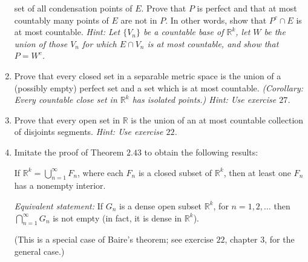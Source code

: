 \begin{enumerate}
  set of all condensation points of \(E\).
  Prove that \(P\) is perfect and that at most countably many points of \(E\)
  are not in \(P\).
  In other words, show that \(P^c\cap E\) is at most countable.
  \textit{Hint: Let \(\{V_n\}\) be a countable base of \(\mathbb{R}^k\), let
    \(W\) be the union of those \(V_n\) for which \(E\cap V_n\) is at most
    countable, and show that \(P = W^c\).}
\item
  Prove that every closed set in a separable metric space is the union of a
  (possibly empty) perfect set and a set which is at most countable.
  \textit{(Corollary: Every countable close set in \(\mathbb{R}^k\) has
    isolated points.)
    Hint: Use exercise \(27\).}
\item
  Prove that every open set in \(\mathbb{R}\) is the union of an at most
  countable collection of disjoints segments.
  \textit{Hint: Use exercise \(22\).}
\item
  Imitate the proof of Theorem \(2.43\) to obtain the following results:
  \par\smallskip
  If \(\mathbb{R}^k = \bigcup_{n = 1}^{\infty}F_n\), where each \(F_n\) is a
  closed subset of \(\mathbb{R}^k\), then at least one \(F_n\) has a nonempty
  interior.
  \par\smallskip
  \textit{Equivalent statement:} If \(G_n\) is a dense open subset
  \(\mathbb{R}^k\), for \(n = 1,2,\ldots\) then
  \(\bigcap_{n = 1}^{\infty}G_n\) is not empty (in fact, it is dense in
  \(\mathbb{R}^k\)).
  \par\smallskip
  (This is a special case of Baire's theorem; see exercise \(22\), chapter
  \(3\), for the general case.)
\end{enumerate}

